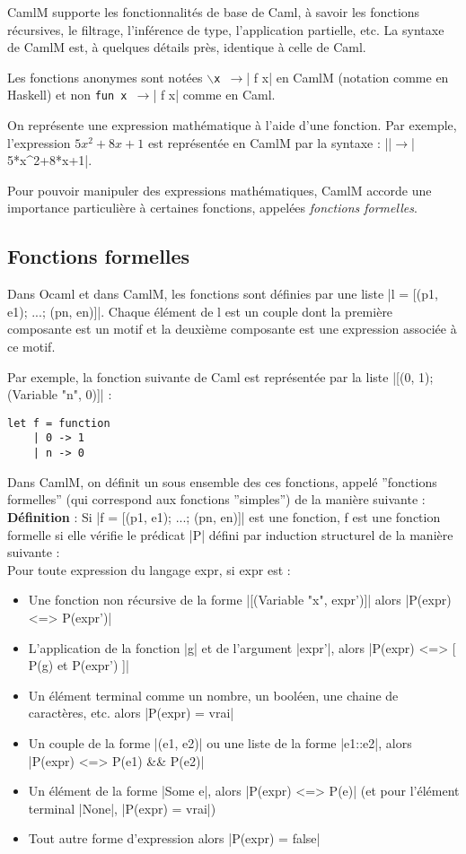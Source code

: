 \documentclass[a4paper, 12pt]{article}
\begin{document}
CamlM supporte les fonctionnalités de base de Caml, à savoir les fonctions récursives, le filtrage, l'inférence de type, l'application partielle, etc.
La syntaxe de CamlM est, à quelques détails près, identique à celle de Caml.

Les fonctions anonymes sont notées  $\backslash$\lstinline|x |$\rightarrow$| f x| en CamlM (notation comme en Haskell) et non \lstinline|fun x |$\rightarrow$| f x| comme en Caml.

On représente une expression mathématique à l'aide d'une fonction.
Par exemple, l'expression $5x^2+8x+1$ est représentée en CamlM par la syntaxe : |\x |$\rightarrow$| 5*x^2+8*x+1|.

Pour pouvoir manipuler des expressions mathématiques, CamlM 	accorde une importance particulière à certaines fonctions, appelées \textit{fonctions formelles}.

\subsection{Fonctions formelles}
\label{fonctions}
Dans Ocaml et dans CamlM, les fonctions sont définies par une liste |l = [(p1, e1); ...; (pn, en)]|. Chaque élément de l est un couple dont la première composante est un motif et la deuxième composante est une expression associée à ce motif.

Par exemple, la fonction suivante de Caml est représentée par la liste |[(0, 1); (Variable "n", 0)]| : 
\begin{lstlisting}
let f = function
	| 0 -> 1
	| n -> 0
\end{lstlisting}

Dans CamlM, on définit un sous ensemble des ces fonctions, appelé ''fonctions formelles'' (qui correspond aux fonctions ''simples'') de la manière suivante : \\


\textbf{Définition} : Si |f = [(p1, e1); ...; (pn, en)]| est une fonction, f est une fonction formelle si elle vérifie le prédicat |P| défini par induction structurel de la manière suivante :\\

Pour toute expression du langage expr, si expr est :
\begin{itemize}
\item Une fonction non récursive de la forme |[(Variable "x", expr')]| alors |P(expr) <=> P(expr')|
\item L'application de la fonction |g| et de l'argument |expr'|, alors |P(expr) <=> [ P(g) et P(expr') ]|
\item Un élément terminal comme un nombre, un booléen, une chaine de caractères, etc. alors |P(expr) = vrai|
\item Un couple de la forme |(e1, e2)| ou une liste de la forme |e1::e2|, alors |P(expr) <=> P(e1) && P(e2)|
\item Un élément de la forme |Some e|, alors |P(expr) <=> P(e)| (et pour l'élément terminal |None|, |P(expr) = vrai|)
\item Tout autre forme d’expression alors |P(expr) = false|

\end{itemize}
\end{document}

